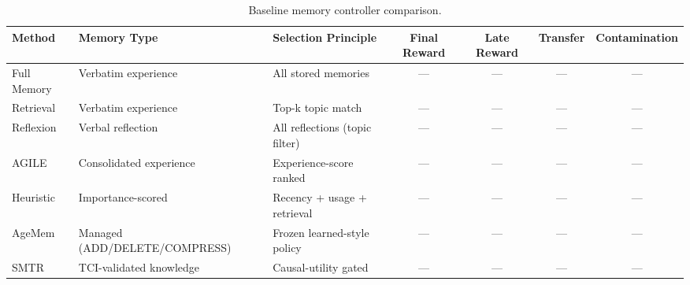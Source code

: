 \begin{table}[t]
\caption{Baseline memory controller comparison.}
\label{tab:baselines}
\centering
\begin{tabular}{l l l c c c c}
\toprule
Method & Memory Type & Selection Principle & Final Reward & Late Reward & Transfer & Contamination \\
\midrule
Full Memory & Verbatim experience & All stored memories & --- & --- & --- & --- \\
Retrieval & Verbatim experience & Top-k topic match & --- & --- & --- & --- \\
Reflexion & Verbal reflection & All reflections (topic filter) & --- & --- & --- & --- \\
AGILE & Consolidated experience & Experience-score ranked & --- & --- & --- & --- \\
Heuristic & Importance-scored & Recency + usage + retrieval & --- & --- & --- & --- \\
AgeMem & Managed (ADD/DELETE/COMPRESS) & Frozen learned-style policy & --- & --- & --- & --- \\
SMTR & TCI-validated knowledge & Causal-utility gated & --- & --- & --- & --- \\
\bottomrule
\end{tabular}
\end{table}
